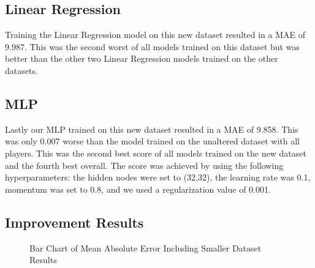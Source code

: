 \documentclass{article}
\begin{document}
\subsection{Linear Regression}

Training the Linear Regression model on this new dataset resulted in a MAE of
9.987. This was the second worst of all models trained on this dataset but was
better than the other two Linear Regression models trained on the other
datasets.

\subsection{MLP}

Lastly our MLP trained on this new dataset resulted in a MAE of 9.858. This was
only 0.007 worse than the model trained on the unaltered dataset with all
players. This was the second best score of all models trained on the new dataset
and the fourth best overall. The score was achieved by using the following
hyperparameters: the hidden nodes were set to (32,32), the learning rate was
0.1, momentum was set to 0.8, and we used a regularization value of 0.001.

\subsection{Improvement Results}

\begin{figure}
	\begin{center}
    \caption{Bar Chart of Mean Absolute Error Including Smaller Dataset Results}
    \label{fig:improved_results}
	\end{center}
\end{figure}
\end{document}
